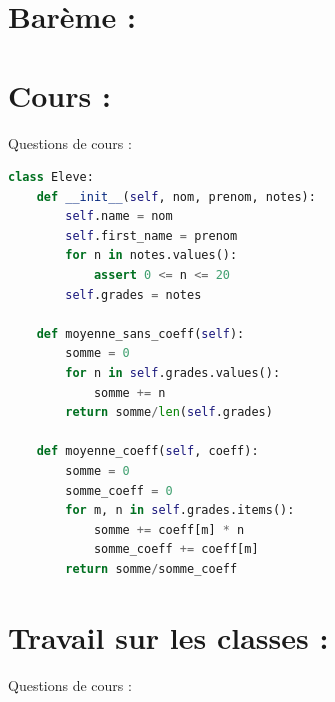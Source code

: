 \documentclass[a4paper, noanswers, addpoints, 12pt]{exam}
\begin{document}
\section*{Barème :}
\begin{center}
  \par\bigskip
  \gradetable[h]
\end{center}
\begin{questions}


\section{Cours : }
\question[4] Questions de cours :
\begin{lstlisting}[language=Python]
class Eleve:
    def __init__(self, nom, prenom, notes):
        self.name = nom
        self.first_name = prenom
        for n in notes.values():
            assert 0 <= n <= 20
        self.grades = notes

    def moyenne_sans_coeff(self):
        somme = 0
        for n in self.grades.values():
            somme += n
        return somme/len(self.grades)

    def moyenne_coeff(self, coeff):
        somme = 0
        somme_coeff = 0
        for m, n in self.grades.items():
            somme += coeff[m] * n
            somme_coeff += coeff[m]
        return somme/somme_coeff
\end{lstlisting}

\section{Travail sur les classes :}
\question[4] Questions de cours :
\begin{parts}

\end{parts}
\end{questions}
\end{document}
